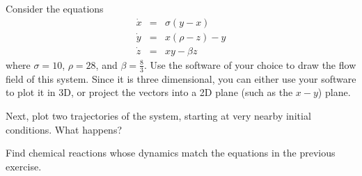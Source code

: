 \begin{exercise}
%
Consider the equations
\begin{eqnarray*}
\dot x & = & \sigma(y-x) \\
\dot y & = & x(\rho-z)-y \\
\dot z & = & x y - \beta z
\end{eqnarray*}
where $\sigma = 10$, $\rho = 28$, and $\beta = \frac{8}{3}$. Use the
software of your choice to draw the flow field of this system. Since
it is three dimensional, you can either use your software to plot it
in 3D, or project the vectors into a 2D plane (such as the $x-y$)
plane. 

Next, plot two trajectories of the system, starting at very nearby
initial conditions. What happens?
%
\end{exercise}

\begin{exercise}
%
Find chemical reactions whose dynamics match the equations in the
previous exercise.
%
\end{exercise}